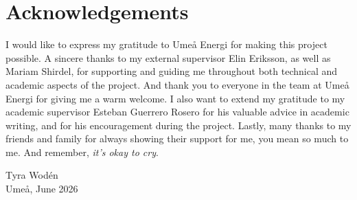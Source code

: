 \documentclass[a4paper,11pt]{report} %
\begin{document}
\begin{abstract}
     \textbf{Keywords:} machine learning (ML), household electricity consumption, monthly electricity consumption, decision tree ensemble learning, explainable artificial intelligence (XAI), SHapley Additive exPlanations (SHAP)
\end{abstract}

\cleardoublepage


\chapter*{Acknowledgements}

I would like to express my gratitude to Umeå Energi for making this project possible. A sincere thanks to my external supervisor Elin Eriksson, as well as Mariam Shirdel, for supporting and guiding me throughout both technical and academic aspects of the project. And thank you to everyone in the team at Umeå Energi for giving me a warm welcome. I also want to extend my gratitude to my academic supervisor Esteban Guerrero Rosero for his valuable advice in academic writing, and for his encouragement during the project. Lastly, many thanks to my friends and family for always showing their support for me, you mean so much to me. And remember, \emph{it's okay to cry}.


Tyra Wodén\\
Umeå, June 2026

\cleardoublepage

\tableofcontents


\cleardoublepage
\end{document}
